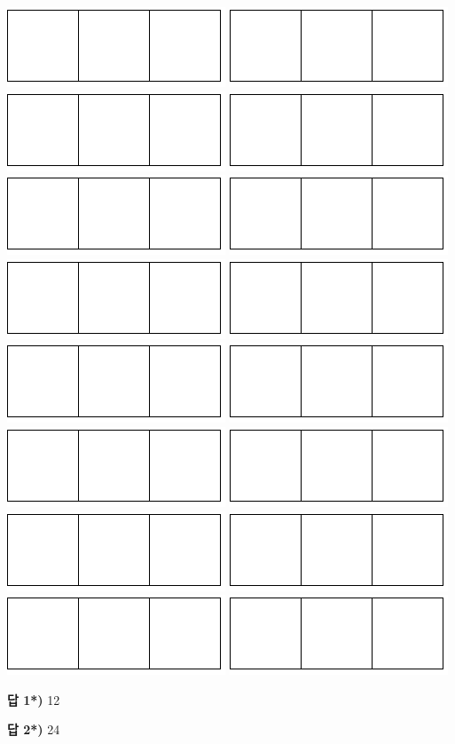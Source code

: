 \documentclass[a4paper]{oblivoir}
\begin{document}
\includegraphics[width=.2\textwidth]{2}\quad
\includegraphics[width=.2\textwidth]{2}\quad
\includegraphics[width=.2\textwidth]{2}\quad
\includegraphics[width=.2\textwidth]{2}\\[5pt]
\includegraphics[width=.2\textwidth]{2}\quad
\includegraphics[width=.2\textwidth]{2}\quad
\includegraphics[width=.2\textwidth]{2}\quad
\includegraphics[width=.2\textwidth]{2}\\[5pt]
\includegraphics[width=.2\textwidth]{2}\quad
\includegraphics[width=.2\textwidth]{2}\quad
\includegraphics[width=.2\textwidth]{2}\quad
\includegraphics[width=.2\textwidth]{2}\\[5pt]
\includegraphics[width=.2\textwidth]{2}\quad
\includegraphics[width=.2\textwidth]{2}\quad
\includegraphics[width=.2\textwidth]{2}\quad
\includegraphics[width=.2\textwidth]{2}
\newpage
\shipoutAnswer

\bigskip\noindent \textbf{답 1*)} 12

\bigskip\noindent \textbf{답 2*)} 24
\end{document}
